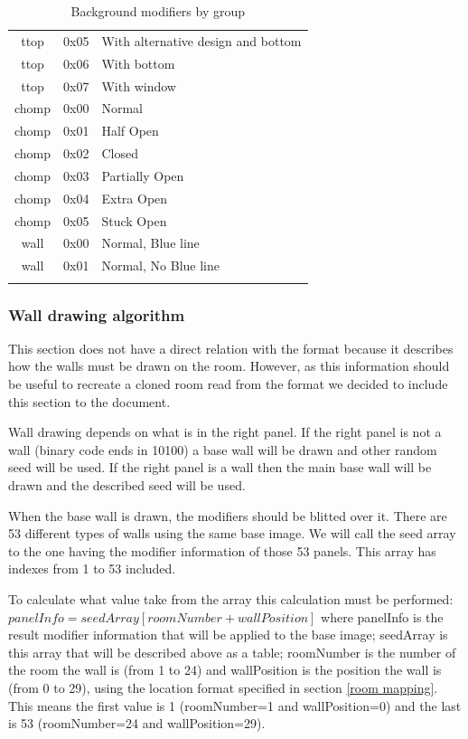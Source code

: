 \documentclass{article}
\begin{document}
\begin{longtable}{ccl}
 ttop  & 0x05 & With alternative design and bottom\footnotemark[2] \\
 ttop  & 0x06 & With bottom\footnotemark[2] \\
 ttop  & 0x07 & With window\footnotemark[2] \\
 chomp & 0x00 & Normal \\
 chomp & 0x01 & Half Open \\
 chomp & 0x02 & Closed \\
 chomp & 0x03 & Partially Open \\
 chomp & 0x04 & Extra Open \\
 chomp & 0x05 & Stuck Open \\
 wall  & 0x00 & Normal\footnotemark[1], Blue line\footnotemark[2] \\
 wall  & 0x01 & Normal\footnotemark[1], No Blue line\footnotemark[2] \\
\hline

\caption{Background modifiers by group}
\label{background modifiers}
\end{longtable}

\subsubsection{Wall drawing algorithm} %
 This section does not have a direct relation with the format because it
 describes how the walls must be drawn on the room. However, as this
 information should be useful to recreate a cloned room read from the
 format we decided to include this section to the document.

 Wall drawing depends on what is in the right panel. If the right panel
 is not a wall (binary code ends in 10100) a base wall will be drawn and
 other random seed will be used. If the right panel is a wall then the main
 base wall will be drawn and the described seed will be used.

 When the base wall is drawn, the modifiers should be blitted over it.
 There are 53 different types of walls using the same base image.
 We will call the seed array to the one having the modifier information of
 those 53 panels. This array has indexes from 1 to 53 included.

 To calculate what value take from the array this calculation must be
 performed: $panelInfo=seedArray[roomNumber+wallPosition]$
 where panelInfo is the result modifier information that will be applied to
 the base image; seedArray is this array that will be described above as a
 table; roomNumber is the number of the room the wall is (from 1 to 24)
 and wallPosition is the position the wall is (from 0 to 29), using the
 location format specified in section \ref{room mapping}. This means the first value is
 1 (roomNumber=1 and wallPosition=0) and the last is 53 (roomNumber=24
 and wallPosition=29).
\end{document}
